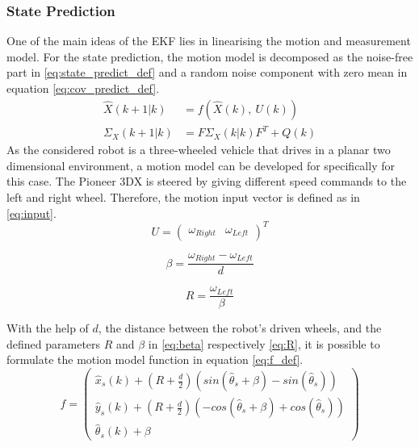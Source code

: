 \subsubsection{State Prediction}
\label{subsubsec:State_Prediction}
One of the main ideas of the EKF lies in linearising the motion and measurement model.
For the state prediction, the motion model is decomposed as the noise-free part in  \eqref{eq:state_predict_def} and a random noise component with zero mean in equation \eqref{eq:cov_predict_def}.
\begin{align}
\hat{X}(k+1|k) &= f(\hat{X}(k),~U(k)) \label{eq:state_predict_def} \\
\Sigma_{X}(k+1|k) &= F \Sigma_{X}(k|k) F^{T} + Q(k) \label{eq:cov_predict_def} 
\end{align}
As the considered robot is a three-wheeled vehicle that drives in a planar two dimensional environment, a motion model can be developed for specifically for this case. The Pioneer 3DX is steered by giving different speed commands to the left and right wheel. Therefore, the motion input vector is defined as in \eqref{eq:input}.
\begin{equation}
U=\begin{pmatrix}\omega_{Right} & \omega_{Left} \end{pmatrix}^T \label{eq:input}
\end{equation}
\noindent\begin{minipage}{.53\linewidth}
\centering
\begin{equation}
\beta=\frac{\omega_{Right}-\omega_{Left}}{d} \label{eq:beta}
\end{equation}
\end{minipage}%
\begin{minipage}{.38\linewidth}
\centering
\begin{equation}
R=\frac{\omega_{Left}}{\beta} \label{eq:R}
\end{equation}
\end{minipage}

With the help of $d$, the distance between the robot's driven wheels, and the defined parameters $R$ and $\beta$ in \eqref{eq:beta} respectively \eqref{eq:R}, it is possible to formulate the motion model function in equation \eqref{eq:f_def}.
\begin{equation}
f = \begin{pmatrix} \hat{x}_s(k) + (R+\frac{d}{2})(sin(\hat{\theta}_s+ \beta)-sin(\hat{\theta}_s)) \\ \hat{y}_s(k) + (R+{\frac{d}{2}})(-cos(\hat{\theta}_s+ \beta)+cos(\hat{\theta}_s)) \\ \hat{\theta}_s(k) + \beta\end{pmatrix}
\label{eq:f_def}
\end{equation}

